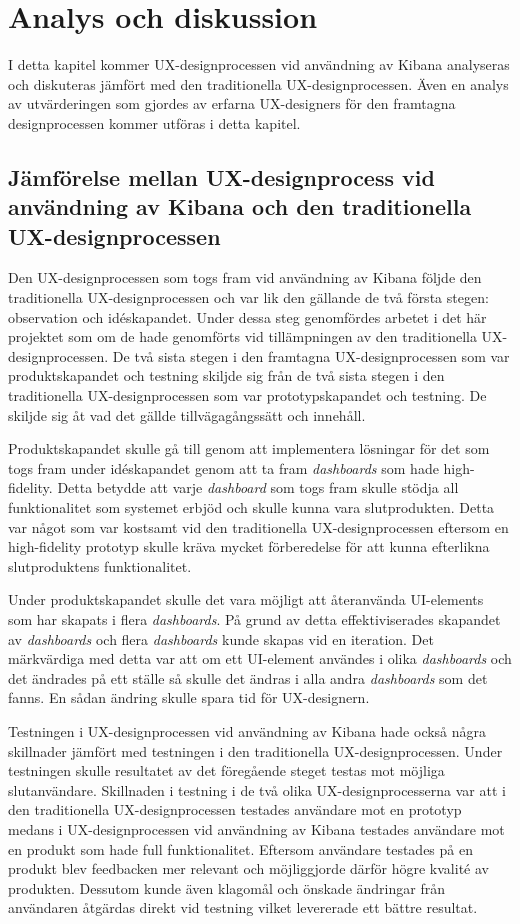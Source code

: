 \documentclass[12pt]{kththesis}
\begin{document}
\afterpage{\null\newpage}

\chapter{Analys och diskussion}
I detta kapitel kommer UX-designprocessen vid användning av Kibana analyseras och diskuteras jämfört med den traditionella UX-designprocessen. Även en analys av utvärderingen som gjordes av erfarna UX-designers för den framtagna designprocessen kommer utföras i detta kapitel. 

\section{ Jämförelse mellan UX-designprocess vid användning av Kibana och den traditionella UX-designprocessen}
Den UX-designprocessen som togs fram vid användning av Kibana följde den traditionella UX-designprocessen och var lik den gällande de två första stegen: observation och idéskapandet. Under dessa steg genomfördes arbetet i det här projektet som om de hade genomförts vid tillämpningen av den traditionella UX-designprocessen. De två sista stegen i den framtagna UX-designprocessen som var produktskapandet och testning skiljde sig från de två sista stegen i den traditionella UX-designprocessen som var prototypskapandet och testning. De skiljde sig åt vad det gällde tillvägagångssätt och innehåll. 

Produktskapandet skulle gå till genom att implementera lösningar för det som togs fram under idéskapandet genom att ta fram \textit{dashboards} som hade high-fidelity. Detta betydde att varje \textit{dashboard} som togs fram skulle stödja all funktionalitet som systemet erbjöd och skulle kunna vara slutprodukten. Detta var något som var kostsamt vid den traditionella UX-designprocessen eftersom en high-fidelity prototyp skulle kräva mycket förberedelse för att kunna efterlikna slutproduktens funktionalitet. 

Under produktskapandet skulle det vara möjligt att återanvända UI-elements som har skapats i flera \textit{dashboards}. På grund av detta effektiviserades skapandet av \textit{dashboards} och flera \textit{dashboards} kunde skapas vid en iteration. Det märkvärdiga med detta var att om ett UI-element användes i olika \textit{dashboards} och det ändrades på ett ställe så skulle det ändras i alla andra \textit{dashboards} som det fanns. En sådan ändring skulle spara tid för UX-designern. 

Testningen i UX-designprocessen vid användning av Kibana hade också några skillnader jämfört med testningen i den traditionella UX-designprocessen. Under testningen skulle resultatet av det föregående steget testas mot möjliga slutanvändare. Skillnaden i testning i de två olika UX-designprocesserna var att i den traditionella UX-designprocessen testades användare mot en prototyp medans i UX-designprocessen vid användning av Kibana testades användare mot en produkt som hade full funktionalitet. Eftersom användare testades på en produkt blev feedbacken mer relevant och möjliggjorde därför högre kvalité av produkten. Dessutom kunde även klagomål och önskade ändringar från användaren åtgärdas direkt vid testning vilket levererade ett bättre resultat.
\end{document}
